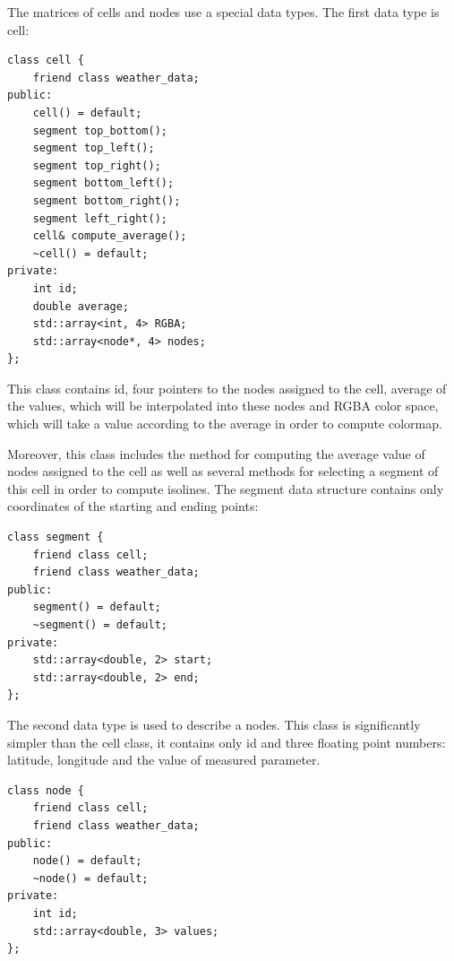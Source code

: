 \documentclass[a4paper, 10pt]{article}
\begin{document}
The matrices of cells and nodes use a special data types. The first data type is 
cell:
\begin{lstlisting}[caption=class cell]
class cell {
	friend class weather_data;
public:
	cell() = default;
	segment top_bottom();
	segment top_left();
	segment top_right();
	segment bottom_left();
	segment bottom_right();
	segment left_right();
	cell& compute_average();
	~cell() = default;
private:
	int id;
	double average;
	std::array<int, 4> RGBA;
	std::array<node*, 4> nodes;
};
\end{lstlisting}
This class contains id, four pointers to the nodes assigned to the cell, average of the values, which will be interpolated into these nodes and RGBA color space, which will take a value according to the average in order to compute colormap.

Moreover, this class includes the method for computing the average value of nodes assigned to the cell as well as several methods for selecting a segment of this cell in order to compute isolines. The segment data structure contains only coordinates of the starting and ending points:
\begin{lstlisting}[caption=class segment]
class segment {
	friend class cell;
	friend class weather_data;
public:
	segment() = default;
	~segment() = default;
private:
	std::array<double, 2> start;
	std::array<double, 2> end;
};
\end{lstlisting}

The second data type is used to describe a nodes. This class is significantly simpler than the cell class, it contains only id and three floating point numbers: latitude, longitude and the value of measured parameter. 
\begin{lstlisting}[caption=class node]
class node {
	friend class cell;
	friend class weather_data;
public:
	node() = default;
	~node() = default;
private:
	int id;
	std::array<double, 3> values;
};
\end{lstlisting}
\end{document}
